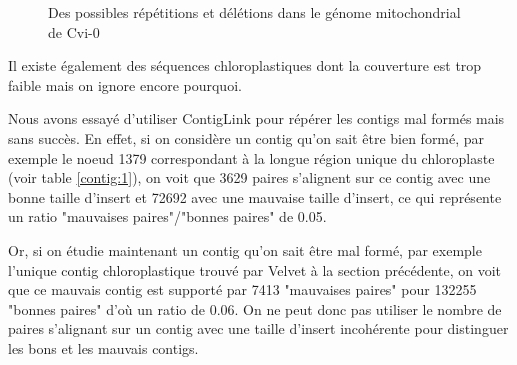 \documentclass[a4paper]{article}
\begin{document}
\begin{enumerate}
\begin{figure}[H]
 \hspace{5mm}

\label{inc}
\caption{Des possibles répétitions et délétions dans le génome mitochondrial de Cvi-0}
\end{figure}

Il existe également des séquences chloroplastiques dont la couverture est trop faible mais on ignore encore pourquoi. 

\end{enumerate}

Nous avons essayé d'utiliser ContigLink pour répérer les contigs mal formés mais sans succès. En effet, si on considère un contig qu'on sait être bien formé, par exemple le noeud 1379 correspondant à la longue région unique du chloroplaste (voir table \ref{contig:1}), on voit que 3629 paires s'alignent sur ce contig avec une bonne taille d'insert et 72692 avec une mauvaise taille d'insert, ce qui représente un ratio "mauvaises paires"/"bonnes paires" de 0.05. 

Or, si on étudie maintenant un contig qu'on sait être mal formé, par exemple l'unique contig chloroplastique trouvé par Velvet à la section précédente, on voit que ce mauvais contig est supporté par 7413 "mauvaises paires" pour 132255 "bonnes paires" d'où un ratio de 0.06. On ne peut donc pas utiliser le nombre de paires s'alignant sur un contig avec une taille d'insert incohérente pour distinguer les bons et les mauvais contigs. 
\end{document}

